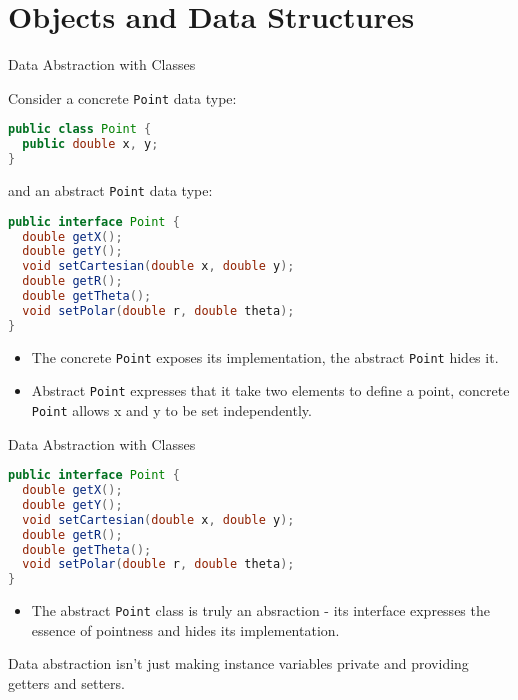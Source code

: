 \documentclass{beamer}
\author[Chris Simpkins] 
{Christopher Simpkins \\\texttt{chris.simpkins@gatech.edu}}
\institute[Georgia Tech] %
\date[CS 1331]{}
\begin{document}
\begin{frame}
  \titlepage
\end{frame}

\section{Objects and Data Structures}

\begin{frame}[fragile]{Data Abstraction with Classes}

\vspace{-.05in}
Consider a concrete {\tt Point} data type:
\vspace{-.05in}
\begin{lstlisting}[language=Java]
public class Point {
  public double x, y;
}
\end{lstlisting}
\vspace{-.06in}
and an abstract {\tt Point} data type:
\vspace{-.05in}
\begin{lstlisting}[language=Java]
public interface Point {
  double getX();
  double getY();
  void setCartesian(double x, double y);
  double getR();
  double getTheta();
  void setPolar(double r, double theta);
}
\end{lstlisting}
\vspace{-.1in}
\begin{itemize}
\item The concrete {\tt Point} exposes its implementation, the abstract {\tt Point} hides it.
\item Abstract {\tt Point} expresses that it take two elements to define a point, concrete {\tt Point} allows x and y to be set independently.
\end{itemize}


\end{frame}

\begin{frame}[fragile]{Data Abstraction with Classes}

\vspace{-.05in}
\begin{lstlisting}[language=Java]
public interface Point {
  double getX();
  double getY();
  void setCartesian(double x, double y);
  double getR();
  double getTheta();
  void setPolar(double r, double theta);
}
\end{lstlisting}
\vspace{-.1in}
\begin{itemize}
\item The abstract {\tt Point} class is truly an absraction - its interface expresses the essence of pointness and hides its implementation.
\end{itemize}
Data abstraction isn't just making instance variables private and providing getters and setters.


\end{frame}
\end{document}
